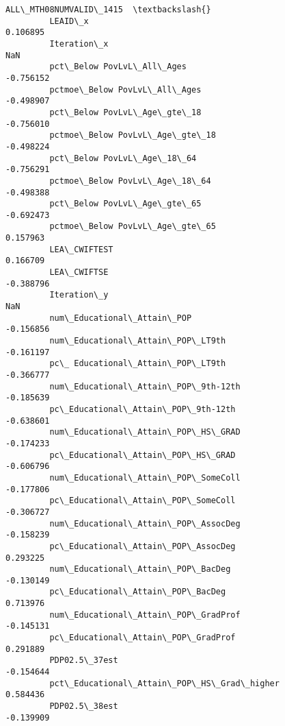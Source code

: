 \documentclass[11pt]{article}
\begin{document}
\begin{Verbatim}[commandchars=\\\{\}]
                                                    ALL\_MTH08NUMVALID\_1415  \textbackslash{}
         LEAID\_x                                                  0.106895   
         Iteration\_x                                                   NaN   
         pct\_Below PovLvL\_All\_Ages                               -0.756152   
         pctmoe\_Below PovLvL\_All\_Ages                            -0.498907   
         pct\_Below PovLvL\_Age\_gte\_18                             -0.756010   
         pctmoe\_Below PovLvL\_Age\_gte\_18                          -0.498224   
         pct\_Below PovLvL\_Age\_18\_64                              -0.756291   
         pctmoe\_Below PovLvL\_Age\_18\_64                           -0.498388   
         pct\_Below PovLvL\_Age\_gte\_65                             -0.692473   
         pctmoe\_Below PovLvL\_Age\_gte\_65                           0.157963   
         LEA\_CWIFTEST                                             0.166709   
         LEA\_CWIFTSE                                             -0.388796   
         Iteration\_y                                                   NaN   
         num\_Educational\_Attain\_POP                              -0.156856   
         num\_Educational\_Attain\_POP\_LT9th                        -0.161197   
         pc\_ Educational\_Attain\_POP\_LT9th                        -0.366777   
         num\_Educational\_Attain\_POP\_9th-12th                     -0.185639   
         pc\_Educational\_Attain\_POP\_9th-12th                      -0.638601   
         num\_Educational\_Attain\_POP\_HS\_GRAD                      -0.174233   
         pc\_Educational\_Attain\_POP\_HS\_GRAD                       -0.606796   
         num\_Educational\_Attain\_POP\_SomeColl                     -0.177806   
         pc\_Educational\_Attain\_POP\_SomeColl                      -0.306727   
         num\_Educational\_Attain\_POP\_AssocDeg                     -0.158239   
         pc\_Educational\_Attain\_POP\_AssocDeg                       0.293225   
         num\_Educational\_Attain\_POP\_BacDeg                       -0.130149   
         pc\_Educational\_Attain\_POP\_BacDeg                         0.713976   
         num\_Educational\_Attain\_POP\_GradProf                     -0.145131   
         pc\_Educational\_Attain\_POP\_GradProf                       0.291889   
         PDP02.5\_37est                                           -0.154644   
         pct\_Educational\_Attain\_POP\_HS\_Grad\_higher                0.584436   
         PDP02.5\_38est                                           -0.139909   

\end{Verbatim}
\end{document}
